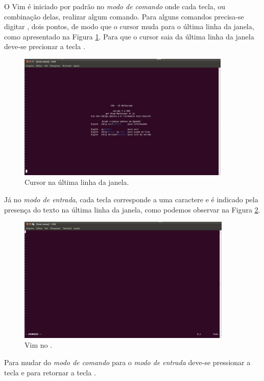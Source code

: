 O Vim é iniciado por padrão no \textit{modo de comando} onde cada tecla, ou combinação delas, realizar algum comando. Para alguns comandos precisa-se digitar \lcode{:} , dois pontos, de modo que o cursor muda para o última linha da janela, como apresentado na Figura \ref{fig:vim_colon_screen}. Para que o cursor saia da última linha da janela deve-se precionar a tecla .
\begin{figure}[h!]
    \centering
    \includegraphics[height=6cm]{figures/vim_colon_screen}
    \caption{Cursor na última linha da janela.}
    \label{fig:vim_colon_screen}
\end{figure}

Já no \textit{modo de entrada}, cada tecla corresponde a uma caractere e é indicado pela presença do texto  na última linha da janela, como podemos observar na Figura \ref{fig:vim_insert_screen}.
\begin{figure}[h!]
    \centering
    \includegraphics[height=6cm]{figures/vim_insert_screen}
    \caption{Vim no .}
    \label{fig:vim_insert_screen}
\end{figure}
Para mudar do \textit{modo de comando} para o \textit{modo de entrada} deve-se pressionar a tecla  e para retornar a tecla .

